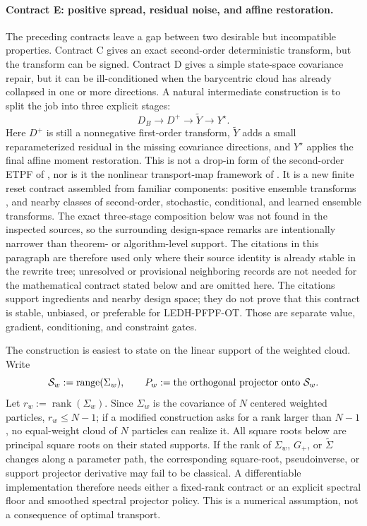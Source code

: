 \paragraph{Contract E: positive spread, residual noise, and affine restoration.}
The preceding contracts leave a gap between two desirable but incompatible
properties.  Contract C gives an exact second-order deterministic transform, but
the transform can be signed.  Contract D gives a simple state-space covariance
repair, but it can be ill-conditioned when the barycentric cloud has already
collapsed in one or more directions.  A natural intermediate construction is to
split the job into three explicit stages:
\[
  D_B \longrightarrow D^+
  \longrightarrow \widetilde Y
  \longrightarrow Y^\star .
\]
Here \(D^+\) is still a nonnegative first-order transform, \(\widetilde Y\)
adds a small reparameterized residual in the missing covariance directions, and
\(Y^\star\) applies the final affine moment restoration.  This is not a
drop-in form of the second-order ETPF of
\citet{acevedodewiljesreich2017secondorder}, nor is it the nonlinear
transport-map framework of \citet{spantini2022coupling}.  It is a new finite
reset contract assembled from familiar components: positive ensemble transforms
\citep{reich2013nonparametric,corenflos2021differentiable}, and nearby classes
of second-order, stochastic, conditional, and learned ensemble transforms.  The
exact three-stage composition below was not found in the inspected sources, so
the surrounding design-space remarks are intentionally narrower than theorem- or
algorithm-level support.  The citations in this paragraph are therefore used only
where their source identity is already stable in the rewrite tree; unresolved or
provisional neighboring records are not needed for the mathematical contract
stated below and are omitted here.  The citations support ingredients and nearby
design space; they do not prove that this contract is stable, unbiased, or
preferable for LEDH-PFPF-OT.  Those are separate value, gradient,
conditioning, and constraint gates.

The construction is easiest to state on the linear support of the weighted
cloud.  Write
\[
  \mathcal S_w:=\operatorname{range}(\Sigma_w),
  \qquad
  P_w:=\hbox{the orthogonal projector onto }\mathcal S_w .
\]
Let \(r_w:=\operatorname{rank}(\Sigma_w)\).  Since \(\Sigma_w\) is the covariance
of \(N\) centered weighted particles, \(r_w\le N-1\); if a modified construction
asks for a rank larger than \(N-1\), no equal-weight cloud of \(N\) particles can
realize it.  All square roots below are principal square roots on their stated
supports.  If
the rank of \(\Sigma_w\), \(G_+\), or \(\widetilde\Sigma\) changes along a
parameter path, the corresponding square-root, pseudoinverse, or support
projector derivative may fail to be classical.  A differentiable implementation
therefore needs either a fixed-rank contract or an explicit spectral floor and
smoothed spectral projector policy.  This is a numerical assumption, not a
consequence of optimal transport.

